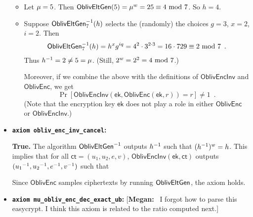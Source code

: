\documentclass[11pt,letterpaper]{article}
\newcommand{\authnote}[2]{[{\color{red}\textbf{#1:}}~{\color{blue} #2}]}
\newcommand{\authnote}[2]{}
\newcommand{\megan}[1]{\authnote{Megan}{#1}}
\theoremstyle{plain} %
\theoremstyle{definition} %
\theoremstyle{remark} %
\newcommand{\code}[1]{\texttt{#1}} %
\newcommand{\OblivEnc}{\mathsf{OblivEnc}}
\newcommand{\OblivEncInv}{\mathsf{OblivEncInv}}
\newcommand{\EncKey}{\mathsf{ek}}
\newcommand{\Ct}{\mathsf{ct}}
\newcommand{\Rand}{r}
\newcommand{\GrpOrd}{q}
\newcommand{\GrpEltE}{e}
\newcommand{\GrpEltH}{h}
\newcommand{\GrpEltU}{u}
\newcommand{\GrpEltV}{v}
\newcommand{\Generator}{g}
\begin{document}
\begin{itemize}
\begin{itemize}[nolistsep]
    \item Let $\mu = 5$. Then $\mathsf{OblivEltGen}(5) = \mu^{w} = 25 \equiv 4 \textrm{ mod } 7$. So $\GrpEltH = 4$.
    \item Suppose $\OblivEltInv_{7}(\GrpEltH)$ selects the (randomly) the choices $\Generator=3$, $x = 2$, $i = 2$. Then
    \begin{align*}
    \OblivEltInv_{7}(\GrpEltH) = \GrpEltH^{x}\Generator^{i\GrpOrd} = 4^2 \cdot 3^{2 \cdot 3} = 16 \cdot 729 \equiv 2 \mod 7
    \enspace.
    \end{align*}
    Thus $\Inv{\GrpEltH} = 2 \ne 5 = \RandStr$. (Still, $2^{w} = 2^2 = 4 \textrm{ mod } 7$.)

    Moreover, if we combine the above with the definitions of $\OblivEncInv$ and $\OblivEnc$, we get
    \begin{equation*}
    \Pr\left[\OblivEncInv(\EncKey, \OblivEnc(\EncKey, \Rand)) = \Rand\right] \ne 1
    \enspace.
    \end{equation*}
    (Note that the encryption key $\EncKey$ does not play a role in either $\OblivEnc$ or $\OblivEncInv$.)
\end{itemize}

\item \textbf{\code{axiom obliv\_enc\_inv\_cancel}:}

\textbf{True.} The algorithm ${\mathsf{OblivEltGen}}^{-1}$ outputs $\Inv{\GrpEltH}$ such that $(\Inv{\GrpEltH})^{\OrdW} = \GrpEltH$. This implies that for all $\Ct = (\GrpEltU_1, \GrpEltU_2, \GrpEltE, \GrpEltV)$, $\OblivEncInv(\EncKey,\Ct)$ outputs $(\Inv{\GrpEltU_1}, \Inv{\GrpEltU_2}, \Inv{\GrpEltE}, \Inv{\GrpEltV})$ such that
Since $\OblivEnc$ samples ciphertexts by running $\mathsf{OblivEltGen}$, the axiom holds.

\item \textbf{\code{axiom mu\_obliv\_enc\_dec\_exact\_ub}:} \megan{I forgot how to parse this easycrypt. I think this axiom is related to the ratio computed next.}


\end{itemize}
\end{document}
